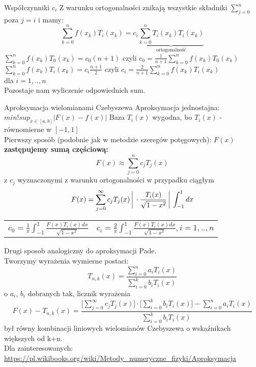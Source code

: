 \begin{frame}{Współczynniki $c_i$}
Z warunku ortogonalności znikają wszystkie składniki $\sum_{j=0}^{n}$ poza $j=i$ i mamy:
 $$\sum_{k=0}^{n}f(x_k)T_i(x_k)=c_i\underbrace{\sum_{k=0}^{n}T_i(x_k)T_i(x_k)}_{\text{ortogonalność}}$$
 $\sum_{k=0}^{n}f(x_k)T_0(x_k)=c_0(n+1)$ czyli 
 $c_0 = \frac{1}{n+1}\sum_{k=0}^{n}f(x_k)T_0(x_k)$\\
 \vspace{0.5cm}
 $\sum_{k=0}^{n}f(x_k)T_i(x_k)=c_i\frac{n+1}{2}$ czyli
 $c_i = \frac{2}{n+1}\sum_{k=0}^{n}f(x_k)T_i(x_k)$\\
 dla $ i=1,..,n$\\
 \vspace{0.5cm}
    Pozostaje nam wyliczenie odpowiednich sum.
\end{frame}
\begin{frame}{Aproksymacja wielomianami Czebyszewa}
    Aproksymacja jednostajna: $min!sup_{x \in [a,b]}|F(x)-f(x)|$ \newline
    Baza $T_i(x)$ wygodna, bo $T_i(x)$ - równomierne w $[-1,1]$ \\
    \vspace{0.5cm}
    Pierwszy sposób (podobnie jak w metodzie  szeregów potęgowych):
    $F(x)$ \textbf{zastępujemy sumą częściową:}
    $$F(x) \approx \sum_{j=0}^{n}c_jT_j(x)$$
    z $c_j$ wyznaczonymi z warunku ortogonalności w przypadku ciągłym
    $$F(x) = \sum_{j=0}^{\infty}c_jT_j(x)    \bigg\arrowvert \cdot\frac{T_i(x)}{\sqrt{1-x^2}}  \bigg\arrowvert \int_{-1}^{1}dx$$
    \begin{tabular}{ll}
        $c_0 = \frac{1}{\pi}\int_{-1}^{1}\frac{F(x)T_i(x)dx}{\sqrt{1-x^2}}$ &
        $c_i = \frac{2}{\pi}\int_{-1}^{1}\frac{F(x)T_i(x)dx}{\sqrt{1-x^2}}, i=1,..,n$
    \end{tabular}

\end{frame}
\begin{frame}
    Drugi sposob analogiczny do aproksymacji Pade.\\ Tworzymy wyrażenia wymierne postaci:
    $$T_{n,k}(x) = \frac{\sum_{i=0}^{n}a_iT_i(x)}{\sum_{i=0}^{k}b_iT_i(x)}$$
    o $a_i$, $b_i$ dobranych tak, licznik wyrażenia  
     $$F(x)-T_{n,k}(x) = \frac{\big[\sum_{j=0}^{\infty}c_jT_j(x)\big] \cdot \big[\sum_{i=0}^{k}b_iT_i(x)\big] - \sum_{i=0}^{n}a_iT_i(x)}{\sum_{i=0}^{k}b_iT_i(x)}$$
     był równy  kombinacji liniowych wielomianów Czebyszewa o wskaźnikach większych od k+n. \\
     
     Dla zainteresowanych:
    \url{https://pl.wikibooks.org/wiki/Metody_numeryczne_fizyki/Aproksymacja}
\end{frame}

